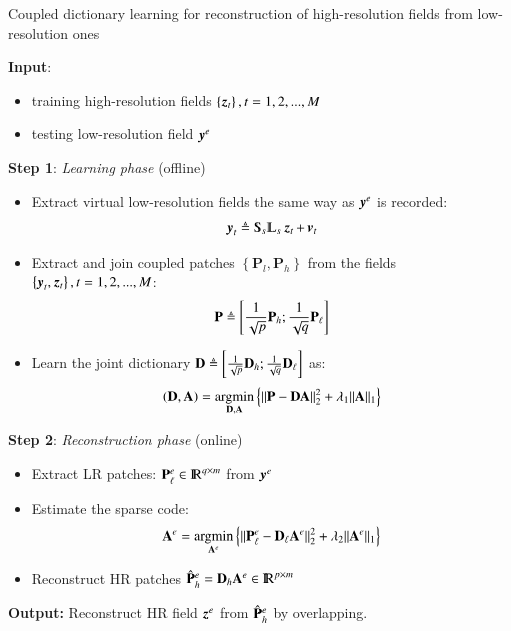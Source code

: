 \begin{algorithm}
\caption{Coupled dictionary learning for reconstruction of high-resolution fields from low-resolution ones} \label{algo_SR}
\begin{algorithmic}[1]
	\State \textbf{Input}:
	\begin{itemize}
		\item training high-resolution fields $ \left\lbrace \operatorname{\boldsymbol{z}}_t \right\rbrace, t=1,2,...,M$
		\item testing low-resolution field $ \operatorname{\boldsymbol{y}}^{e} $
	\end{itemize}
	\State \textbf{Step 1}: \textit{Learning phase} (offline)
	\begin{itemize}
		\item Extract virtual low-resolution fields the same way as $ \operatorname{\boldsymbol{y}}^{e} $ is recorded: 
		\begin{equation}
			\label{eq:algo_SR_1}
			\y_t \mydef \Sub_s\LPF_s\z_t + \mybold{v}_t
		\end{equation}
		\item Extract and join coupled patches $ \left\lbrace \mathbf{P}_l,\mathbf{P}_h \right\rbrace $ from the fields $ \left\lbrace \operatorname{\boldsymbol{y}}_t, \operatorname{\boldsymbol{z}}_t \right\rbrace, t=1,2,...,M $:
		\begin{equation}
			\label{eq:algo_SR_2}		
			\mathbf{P} \triangleq \left[ \frac{1}{\sqrt{p}}\mathbf{P}_h ; \frac{1}{\sqrt{q}}\mathbf{P}_\ell \right]
		\end{equation}
		\item Learn the joint dictionary $ \mathbf{D} \triangleq \left[\frac{1}{\sqrt{p}}\mathbf{D}_h; \frac{1}{\sqrt{q}}\mathbf{D}_\ell \right] $ as:
		\begin{equation}
			\label{eq:algo_SR_3}		
			\left(\mathbf{D}, \mathbf{A}\right) = \operatorname*{\arg\!\min}_{\mathbf{D},\mathbf{A}} \left\lbrace \Vert \mathbf{P}-\mathbf{D} \mathbf{A}\Vert^2_2 + \lambda_1 \Vert \mathbf{A} \Vert_1 \right\rbrace
		\end{equation}
	\end{itemize}	
	\State \textbf{Step 2}: \textit{Reconstruction phase} (online)
	\begin{itemize}
		\item Extract LR patches: $ \mathbf{P}_\ell ^{e} \in {\rm I\!R}^{q \times m}$ from $ \operatorname{\boldsymbol{y}}^{e} $
		\item Estimate the sparse code:
		\begin{equation}
			\label{eq:algo_SR_4}		
			\mathbf{A}^{e} = \operatorname*{\arg\!\min}_{\mathbf{A}^{e}} \left\lbrace \Vert \mathbf{P}_\ell^{e}-\mathbf{D}_\ell \mathbf{A}^{e}\Vert^2_2 + \lambda_2 \Vert \mathbf{A}^{e} \Vert_1 \right\rbrace 
		\end{equation}
		\item Reconstruct HR patches $ \hat{\mathbf{P}}_h^{e} = \mathbf{D}_h\mathbf{A}^{e}  \in {\rm I\!R}^{p \times m} $
	\end{itemize}
	\State \textbf{Output:} Reconstruct HR field $ \operatorname{\boldsymbol{z}}^{e} $ from $  \hat{\mathbf{P}}_h^{e}  $ by overlapping.
\end{algorithmic}
\end{algorithm}
 
